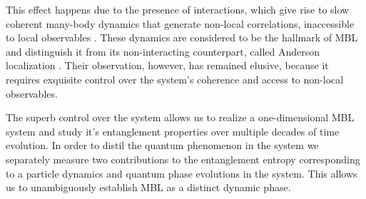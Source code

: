 This effect happens due to the presence of interactions, which give rise to slow coherent many-body dynamics that generate non-local correlations, inaccessible to local observables \cite{Serbyn2013, Serbyn2013a, Huse2014}. These dynamics are considered to be the hallmark of MBL and distinguish it from its non-interacting counterpart, called Anderson localization \cite{Anderson1958, Schwartz2007, Billy2008, Roati2008, Lahini2008, Kondov2011, Jendrzejewski2012, Semeghini2015}. Their observation, however, has remained elusive, because it requires exquisite control over the system's coherence and access to non-local observables.

The superb control over the system allows us to realize a one-dimensional MBL system and study it's entanglement properties over multiple decades of time evolution. In order to distil the quantum phenomenon in the system we separately measure two contributions to the entanglement entropy corresponding to a particle dynamics and quantum phase evolutions in the system. This allows us to unambiguously establish MBL as a distinct dynamic phase.